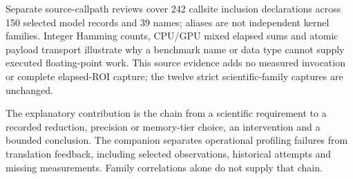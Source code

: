 Separate source-callpath reviews cover 242 callsite inclusion declarations across 150 selected model records and 39 names; aliases are not independent kernel families. Integer Hamming counts, CPU/GPU mixed elapsed sums and atomic payload transport illustrate why a benchmark name or data type cannot supply executed floating-point work. This source evidence adds no measured invocation or complete elapsed-ROI capture; the twelve strict scientific-family captures are unchanged.

The explanatory contribution is the chain from a scientific requirement to a recorded reduction, precision or memory-tier choice, an intervention and a bounded conclusion. The companion separates operational profiling failures from translation feedback, including selected observations, historical attempts and missing measurements. Family correlations alone do not supply that chain.
